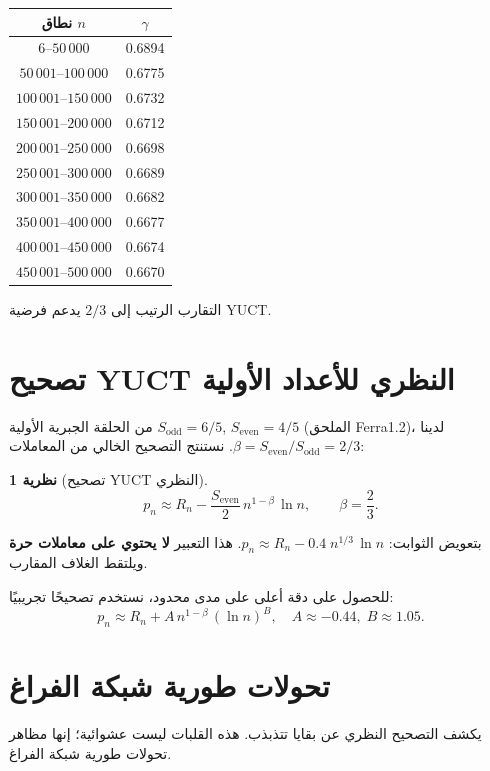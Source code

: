 \documentclass[12pt,a4paper]{article}
\newcommand{\Sodd}{S_{\mathrm{odd}}}
\newcommand{\Seven}{S_{\mathrm{even}}}
\newtheorem{theorem}{نظرية}[section]
\begin{document}
	\begin{center}
		\begin{tabular}{c c}
			\toprule
			نطاق $n$ & $\gamma$ \\
			\midrule
			$6$--$50\,000$    & 0.6894 \\
			$50\,001$--$100\,000$ & 0.6775 \\
			$100\,001$--$150\,000$& 0.6732 \\
			$150\,001$--$200\,000$& 0.6712 \\
			$200\,001$--$250\,000$& 0.6698 \\
			$250\,001$--$300\,000$& 0.6689 \\
			$300\,001$--$350\,000$& 0.6682 \\
			$350\,001$--$400\,000$& 0.6677 \\
			$400\,001$--$450\,000$& 0.6674 \\
			$450\,001$--$500\,000$& 0.6670 \\
			\bottomrule
		\end{tabular}
	\end{center}
	التقارب الرتيب إلى $2/3$ يدعم فرضية YUCT.
	
	\section{تصحيح YUCT النظري للأعداد الأولية}
	من الحلقة الجبرية الأولية \(\Sodd=6/5\), \(\Seven=4/5\) (الملحق Ferra1.2)، لدينا \(\beta = \Seven/\Sodd = 2/3\). نستنتج التصحيح الخالي من المعاملات:
	\begin{theorem}[تصحيح YUCT النظري]
		\begin{equation}\label{eq:yuct-prime-theory}
			\boxed{ p_n \approx R_n - \frac{\Seven}{2}\, n^{1-\beta}\,\ln n },\qquad \beta=\frac{2}{3}.
		\end{equation}
	\end{theorem}
	بتعويض الثوابت: \(p_n \approx R_n - 0.4\; n^{1/3}\,\ln n\). هذا التعبير \textbf{لا يحتوي على معاملات حرة} ويلتقط الغلاف المقارب.
	
	للحصول على دقة أعلى على مدى محدود، نستخدم تصحيحًا تجريبيًا:
	\begin{equation}\label{eq:yuct-prime-empirical}
		p_n \approx R_n + A\,n^{1-\beta}\,(\ln n)^B,\quad A\approx -0.44,\; B\approx 1.05.
	\end{equation}
	
	\section{تحولات طورية شبكة الفراغ}
	\label{sec:phasetrans}
	يكشف التصحيح النظري عن بقايا تتذبذب. هذه القلبات ليست عشوائية؛ إنها مظاهر تحولات طورية شبكة الفراغ.
	
\end{document}
